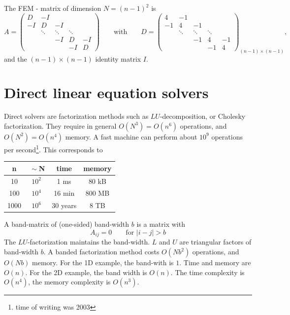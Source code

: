 The FEM - matrix of dimension $N = (n-1)^2$ is
$$
A = \left( \begin{array} {ccccc}
        D & -I  \\
        -I & D & -I \\
         & \ddots & \ddots & \ddots \\
        & & -I & D & -I \\
        & & & -I & D 
        \end{array}
        \right)
\qquad \mbox{with} \qquad
D = \left( \begin{array} {ccccc}
        4 & -1  \\
        -1 & 4 & -1 \\
         & \ddots & \ddots & \ddots \\
        & & -1 & 4 & -1 \\
        & & & -1 & 4 
        \end{array}
        \right)_{(n-1) \times (n-1)},
$$
and the $(n-1) \times (n-1)$ identity matrix $I$.


\section{Direct linear equation solvers}
%
Direct solvers are factorization methods such as $LU$-decomposition,
or Cholesky factorization. They require in general $O(N^3) = O(n^6)$
operations, and $O(N^2) = O(n^4)$ memory. A fast machine can perform
about $10^9$ operations per second\footnote{time of writing was 2003}.  This corresponds to
%
\begin{center}
\begin{tabular}{cccc}
        n &$~\sim$N & time & memory \\
        \hline
        10 & $10^2$ & 1 ms & 80 kB \\
        100 & $10^4$ & 16 min & 800 MB \\
        1000 & $10^6$ & 30 years & 8 TB 
\end{tabular}
\end{center}

\bigskip

A band-matrix of (one-sided) band-width $b$ is a matrix with
$$
A_{ij} = 0 \qquad \mbox{for } |i-j| > b
$$
The $LU$-factorization maintains the band-width. $L$ and $U$ are triangular
factors of band-width $b$. A banded factorization method costs $O(N b^2)$
operations, and $O(Nb)$ memory. 
For the 1D example, the band-with is $1$. Time and memory are $O(n)$. For the
2D example, the band width is $O(n)$. The time complexity is $O(n^4)$, 
the memory complexity is $O(n^3)$.

